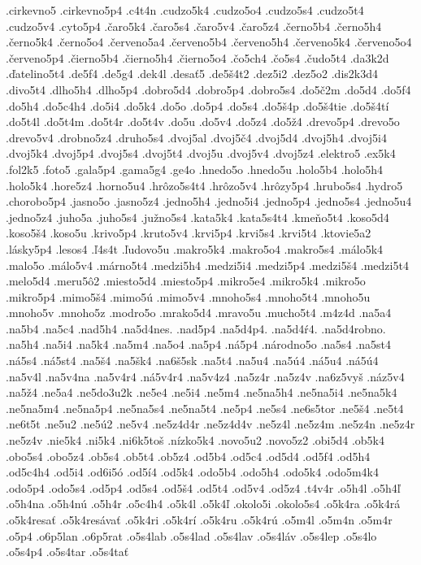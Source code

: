 {.cirkevno5
.cirkevno5p4
.c4t4n
.cudzo5k4
.cudzo5o4
.cudzo5s4
.cudzo5t4
.cudzo5v4
.cyto5p4
.čaro5k4
.čaro5s4
.čaro5v4
.čaro5z4
.černo5b4
.černo5h4
.černo5k4
.černo5o4
.červeno5a4
.červeno5b4
.červeno5h4
.červeno5k4
.červeno5o4
.červeno5p4
.čierno5b4
.čierno5h4
.čierno5o4
.čo5ch4
.čo5s4
.čudo5t4
.da3k2d
.ďatelino5t4
.de5f4
.de5g4
.dek4l
.desať5
.de5š4t2
.dez5i2
.dez5o2
.dis2k3d4
.divo5t4
.dlho5h4
.dlho5p4
.dobro5d4
.dobro5p4
.dobro5s4
.do5č2m
.do5d4
.do5f4
.do5h4
.do5c4h4
.do5i4
.do5k4
.do5o
.do5p4
.do5s4
.do5š4p
.do5š4tie
.do5š4tí
.do5t4l
.do5t4m
.do5t4r
.do5t4v
.do5u
.do5v4
.do5z4
.do5ž4
.drevo5p4
.drevo5o
.drevo5v4
.drobno5z4
.druho5s4
.dvoj5al
.dvoj5č4
.dvoj5d4
.dvoj5h4
.dvoj5i4
.dvoj5k4
.dvoj5p4
.dvoj5s4
.dvoj5t4
.dvoj5u
.dvoj5v4
.dvoj5z4
.elektro5
.ex5k4
.fol2k5
.foto5
.gala5p4
.gama5g4
.ge4o
.hnedo5o
.hnedo5u
.holo5b4
.holo5h4
.holo5k4
.hore5z4
.horno5u4
.hrôzo5s4t4
.hrôzo5v4
.hrôzy5p4
.hrubo5s4
.hydro5
.chorobo5p4
.jasno5o
.jasno5z4
.jedno5h4
.jedno5i4
.jedno5p4
.jedno5s4
.jedno5u4
.jedno5z4
.juho5a
.juho5s4
.južno5s4
.kata5k4
.kata5s4t4
.kmeňo5t4
.koso5d4
.koso5š4
.koso5u
.krivo5p4
.kruto5v4
.krvi5p4
.krvi5s4
.krvi5t4
.ktovie5a2
.lásky5p4
.lesos4
.ľ4s4t
.ľudovo5u
.makro5k4
.makro5o4
.makro5s4
.málo5k4
.malo5o
.málo5v4
.márno5t4
.medzi5h4
.medzi5i4
.medzi5p4
.medzi5š4
.medzi5t4
.melo5d4
.meru5ô2
.miesto5d4
.miesto5p4
.mikro5e4
.mikro5k4
.mikro5o
.mikro5p4
.mimo5š4
.mimo5ú
.mimo5v4
.mnoho5s4
.mnoho5t4
.mnoho5u
.mnoho5v
.mnoho5z
.modro5o
.mrako5d4
.mravo5u
.mucho5t4
.m4z4d
.na5a4
.na5b4
.na5c4
.nad5h4
.na5d4nes.
.nad5p4
.na5d4p4.
.na5d4ŕ4.
.na5d4robno.
.na5h4
.na5i4
.na5k4
.na5m4
.na5o4
.na5p4
.ná5p4
.národno5o
.na5s4
.na5st4
.ná5s4
.ná5st4
.na5š4
.na5šk4
.na6š5sk
.na5t4
.na5u4
.na5ú4
.ná5u4
.ná5ú4
.na5v4l
.na5v4na
.na5v4r4
.ná5v4r4
.na5v4z4
.na5z4r
.na5z4v
.na6z5vyš
.náz5v4
.na5ž4
.ne5a4
.ne5do3u2k
.ne5e4
.ne5i4
.ne5m4
.ne5na5h4
.ne5na5i4
.ne5na5k4
.ne5na5m4
.ne5na5p4
.ne5na5s4
.ne5na5t4
.ne5p4
.ne5s4
.ne6s5tor
.ne5š4
.ne5t4
.ne6t5t
.ne5u2
.ne5ú2
.ne5v4
.ne5z4d4r
.ne5z4d4v
.ne5z4l
.ne5z4m
.ne5z4n
.ne5z4r
.ne5z4v
.nie5k4
.ni5k4
.ni6k5toš
.nízko5k4
.novo5u2
.novo5z2
.obi5d4
.ob5k4
.obo5s4
.obo5z4
.ob5s4
.ob5t4
.ob5z4
.od5b4
.od5c4
.od5d4
.od5f4
.od5h4
.od5c4h4
.od5i4
.od6i5ó
.od5í4
.od5k4
.odo5b4
.odo5h4
.odo5k4
.odo5m4k4
.odo5p4
.odo5s4
.od5p4
.od5s4
.od5š4
.od5t4
.od5v4
.od5z4
.t4v4r
.o5h4l
.o5h4ľ
.o5h4na
.o5h4nú
.o5h4r
.o5c4h4
.o5k4l
.o5k4ľ
.okolo5i
.okolo5s4
.o5k4ra
.o5k4rá
.o5k4resať
.o5k4resávať
.o5k4ri
.o5k4rí
.o5k4ru
.o5k4rú
.o5m4l
.o5m4n
.o5m4r
.o5p4
.o6p5lan
.o6p5rat
.o5s4lab
.o5s4lad
.o5s4lav
.o5s4láv
.o5s4lep
.o5s4lo
.o5s4p4
.o5s4tar
.o5s4tať
}
